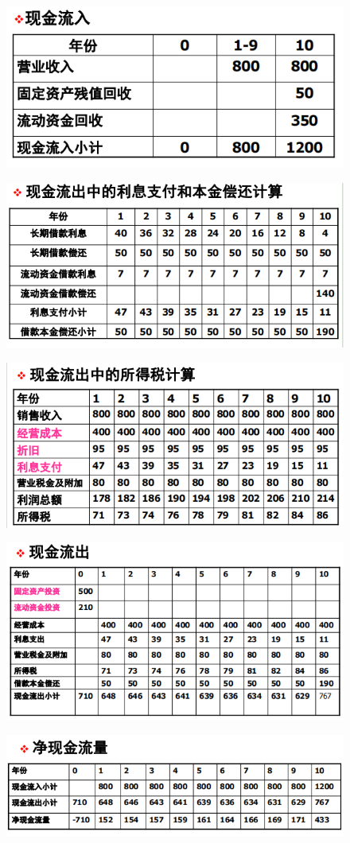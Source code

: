 \begin{figure}[H]
    \centering
    \includegraphics[width=0.75\linewidth]{image/生存能力分析1.png}
\end{figure}

\begin{figure}[H]
    \centering
    \includegraphics[width=0.75\linewidth]{image/生存能力分析2.png}
\end{figure}

\begin{figure}[H]
    \centering
    \includegraphics[width=0.75\linewidth]{image/生存能力分析3.png}
\end{figure}

\begin{figure}[H]
    \centering
    \includegraphics[width=0.75\linewidth]{image/生存能力分析4.png}
\end{figure}

\begin{figure}[H]
    \centering
    \includegraphics[width=0.75\linewidth]{image/生存能力分析5.png}
\end{figure}